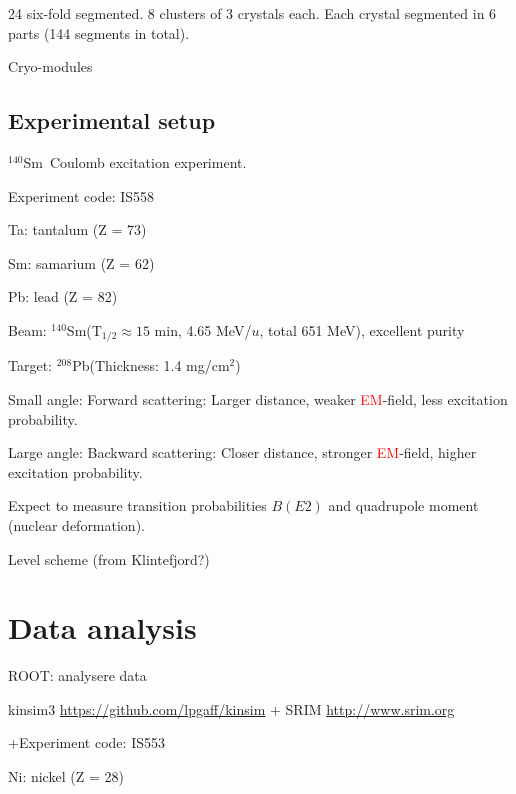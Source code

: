\documentclass[twoside,english]{uiofysmaster/uiofysmaster}
\newcommand{\Sm}{$^{140}$Sm} %
\newcommand{\Pb}{$^{208}$Pb}
\begin{document}
24 six-fold segmented. 8 clusters of 3 crystals each. Each crystal segmented in 6 parts (144 segments in total).


\bigskip

Cryo-modules

\section{Experimental setup}
\Sm ~Coulomb excitation experiment.

Experiment code: IS558 

Ta: tantalum (Z = 73)

Sm: samarium (Z = 62)

Pb: lead (Z = 82) \newline



Beam: \Sm (T$_{1/2} \approx 15$ min, 4.65 MeV/$u$, total 651 MeV), excellent purity

Target: \Pb (Thickness: 1.4 mg/cm$^2$)


Small angle: Forward scattering: Larger distance, weaker \textcolor{red}{EM}-field, less excitation probability.

Large angle: Backward scattering: Closer distance, stronger \textcolor{red}{EM}-field, higher excitation probability. \newline


\bigskip

Expect to measure transition probabilities $B(E2)$ and quadrupole moment (nuclear deformation). 

\bigskip

Level scheme (from Klintefjord?)




\chapter{Data analysis} 

ROOT: analysere data

kinsim3 \url{https://github.com/lpgaff/kinsim} + SRIM \url{http://www.srim.org}

 +Experiment code: IS553

Ni: nickel (Z = 28)
\end{document}
